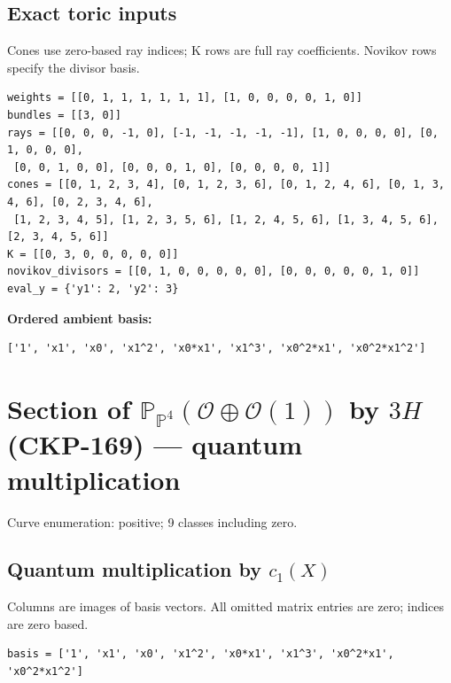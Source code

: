\documentclass[10pt,a4paper]{article}
\begin{document}
\subsection*{Exact toric inputs}
Cones use zero-based ray indices; K rows are full ray coefficients. Novikov rows specify the divisor basis.

\begin{lstlisting}
weights = [[0, 1, 1, 1, 1, 1, 1], [1, 0, 0, 0, 0, 1, 0]]
bundles = [[3, 0]]
rays = [[0, 0, 0, -1, 0], [-1, -1, -1, -1, -1], [1, 0, 0, 0, 0], [0, 1, 0, 0, 0],
 [0, 0, 1, 0, 0], [0, 0, 0, 1, 0], [0, 0, 0, 0, 1]]
cones = [[0, 1, 2, 3, 4], [0, 1, 2, 3, 6], [0, 1, 2, 4, 6], [0, 1, 3, 4, 6], [0, 2, 3, 4, 6],
 [1, 2, 3, 4, 5], [1, 2, 3, 5, 6], [1, 2, 4, 5, 6], [1, 3, 4, 5, 6], [2, 3, 4, 5, 6]]
K = [[0, 3, 0, 0, 0, 0, 0]]
novikov_divisors = [[0, 1, 0, 0, 0, 0, 0], [0, 0, 0, 0, 0, 1, 0]]
eval_y = {'y1': 2, 'y2': 3}
\end{lstlisting}

\textbf{Ordered ambient basis:}
\begin{lstlisting}
['1', 'x1', 'x0', 'x1^2', 'x0*x1', 'x1^3', 'x0^2*x1', 'x0^2*x1^2']
\end{lstlisting}

\clearpage\section*{Section of $\mathbb P_{\mathbb P^{4}}(\mathcal O\oplus \mathcal O(1))$ by $3H$ (CKP-169) --- quantum multiplication}

Curve enumeration: positive; 9 classes including zero.
\subsection*{Quantum multiplication by $c_1(X)$}
Columns are images of basis vectors. All omitted matrix entries are zero; indices are zero based.

\begin{lstlisting}
basis = ['1', 'x1', 'x0', 'x1^2', 'x0*x1', 'x1^3', 'x0^2*x1', 'x0^2*x1^2']
\end{lstlisting}
\end{document}
